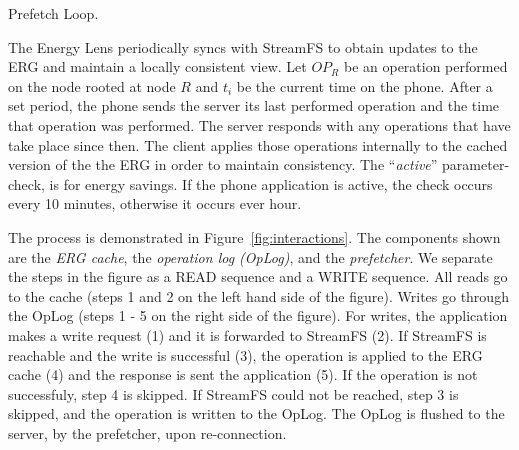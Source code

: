 
\begin{algorithm}[h!]
 \SetAlgoLined
 \caption{Prefetch Loop.}
 \label{alg:prefetch}
\end{algorithm}


The Energy Lens periodically syncs with StreamFS to obtain updates to the ERG and maintain a locally consistent view.  
Let $OP_R$ be an operation performed on the node rooted at node $R$ and $t_i$ be the current time on the phone.  
After a set period, the phone sends the server
its last performed operation and the time that operation was performed.  The server responds with any operations that have
take place since then.  The client applies those operations internally to the cached version of the the ERG in order to 
maintain consistency.  The ``\emph{active}'' parameter-check, is for energy savings.  If the phone application is active, the
check occurs every 10 minutes, otherwise it occurs ever hour.

The process is demonstrated in Figure~\ref{fig:interactions}.  The components shown are the \emph{ERG cache}, the \emph{operation
log (OpLog)}, and the \emph{prefetcher}.  We separate the steps in the figure as a READ sequence and a WRITE sequence.
All reads go to the cache (steps 1 and 2 on the left hand side of the figure).  Writes go through the OpLog (steps 1 - 5 on the right
side of the figure).  For writes, 
the application makes a write request (1) and it is forwarded to StreamFS (2).  If StreamFS is reachable and the write is
successful (3), the operation is applied to the ERG cache (4) and the response is sent the application (5).
If the operation is not successfuly, step 4 is skipped.  If StreamFS could not be reached, step 3 is skipped, and the operation
is written to the OpLog.  The OpLog is flushed to the server, by the prefetcher, upon re-connection. 

